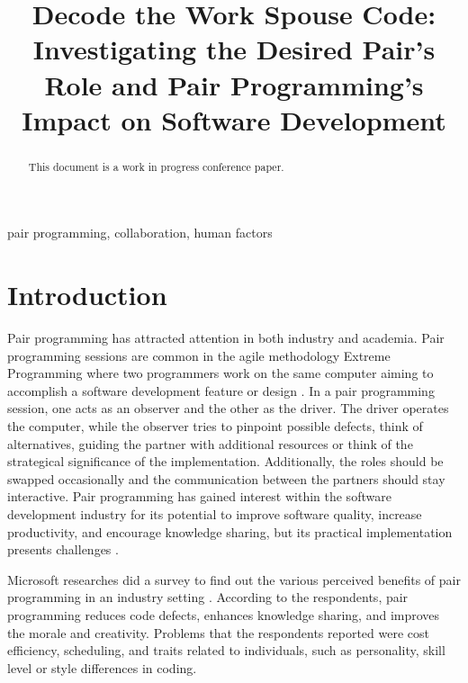 \documentclass[conference]{IEEEtran}
\begin{document}
\title{Decode the Work Spouse Code: Investigating the Desired Pair's Role and Pair Programming's Impact on Software Development}


\author{
}

\maketitle

\begin{abstract}
This document is a work in progress conference paper.
\end{abstract}

\begin{IEEEkeywords}
pair programming, collaboration, human factors
\end{IEEEkeywords}

\section{Introduction}

Pair programming has attracted attention in both industry and academia. Pair programming sessions are common in the agile methodology Extreme Programming where two programmers work on the same computer aiming to accomplish a software development feature or design \cite{10.5555/1076267}. In a pair programming session, one acts as an observer and the other as the driver. The driver operates the computer, while the observer tries to pinpoint possible defects, think of alternatives, guiding the partner with additional resources or think of the strategical significance of the implementation. Additionally, the roles should be swapped occasionally and the communication between the partners should stay interactive. Pair programming has gained interest within the software development industry for its potential to improve software quality, increase productivity, and encourage knowledge sharing, but its practical implementation presents challenges \cite{10.1145/2652524.2652529, Williams2000Strengthening}.

Microsoft researches did a survey to find out the various perceived benefits of pair programming in an industry setting \cite{10.1145/1414004.1414026}. According to the respondents, pair programming reduces code defects, enhances knowledge sharing, and improves the morale and creativity. Problems that the respondents reported were cost efficiency, scheduling, and traits related to individuals, such as personality, skill level or style differences in coding. 
\end{document}
